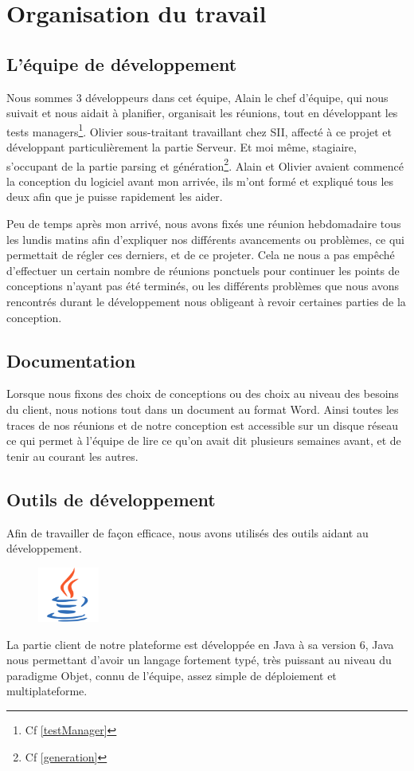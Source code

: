 \chapter{Organisation du travail}
\section{L'équipe de développement}
Nous sommes 3 développeurs dans cet équipe, Alain  le chef d'équipe, qui nous suivait et nous aidait à planifier, organisait les réunions, tout en développant les tests managers\footnote{Cf \ref{testManager}}. Olivier  sous-traitant travaillant chez SII, affecté à ce projet et développant particulièrement la partie Serveur. Et moi même, stagiaire, s'occupant de la partie parsing et génération\footnote{Cf \ref{generation}}. Alain et Olivier avaient commencé la conception du logiciel avant mon arrivée, ils m'ont formé et expliqué tous les deux afin que je puisse rapidement les aider.

Peu de temps après mon arrivé, nous avons fixés une réunion hebdomadaire tous les lundis matins afin d'expliquer nos différents avancements ou problèmes, ce qui permettait de régler ces derniers, et de ce projeter. Cela ne nous a pas empêché d'effectuer un certain nombre de réunions ponctuels pour continuer les points de conceptions n'ayant pas été terminés, ou les différents problèmes que nous avons rencontrés durant le développement nous obligeant à revoir certaines parties de la conception.

\section{Documentation}
Lorsque nous fixons des choix de conceptions ou des choix au niveau des besoins du client, nous notions tout dans un document au format Word. Ainsi toutes les traces de nos réunions et de notre conception est accessible sur un disque réseau ce qui permet à l'équipe de lire ce qu'on avait dit plusieurs semaines avant, et de tenir au courant les autres.

\section{Outils de développement}
Afin de travailler de façon efficace, nous avons utilisés des outils aidant au développement.

\begin{figure}
	\includegraphics[width=2cm]{contents/images/logoJava.png}
\end{figure}
La partie client de notre plateforme est développée en Java à sa version 6, Java nous permettant d'avoir un langage fortement typé, très puissant au niveau du paradigme Objet, connu de l'équipe, assez simple de déploiement et multiplateforme. 

